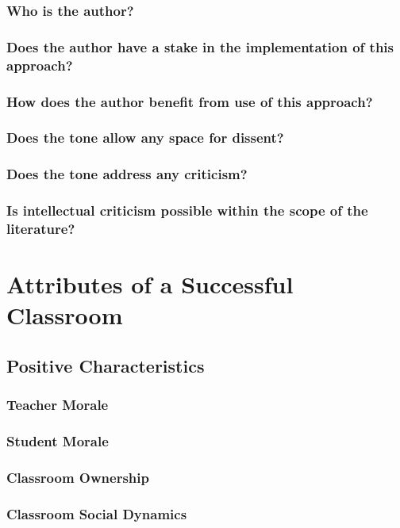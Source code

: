 \documentclass[12pt]{article}
\begin{document}
  \subsubsection{Who is the author?}
  \subsubsection{Does the author have a stake in the implementation of this approach?}
  \subsubsection{How does the author benefit from use of this approach?}
  \subsubsection{Does the tone allow any space for dissent?}
  \subsubsection{Does the tone address any criticism?}
  \subsubsection{Is intellectual criticism possible within the scope of the literature?}

  \section{Attributes of a Successful Classroom}
  \subsection{Positive Characteristics}
  \subsubsection{Teacher Morale}
  \subsubsection{Student Morale}
  \subsubsection{Classroom Ownership}
  \subsubsection{Classroom Social Dynamics}
\end{document}
